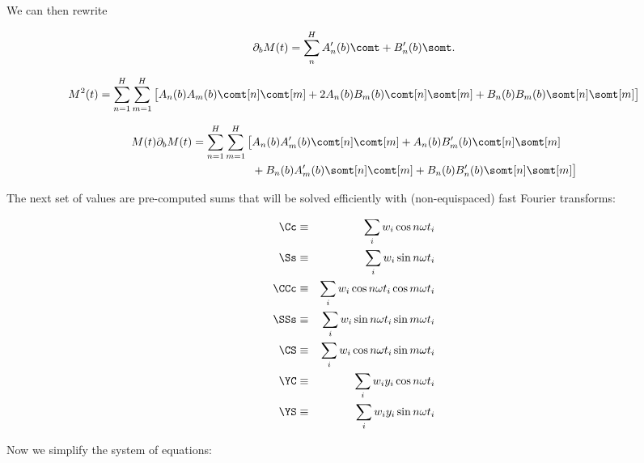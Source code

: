 







We can then rewrite

\begin{equation}
\partial_b M(t) = \sum_n^H A'_n(b)\comt + B'_n(b)\somt.
\end{equation}



\begin{align}
\label{eq:msquared}
M^2(t) = \sum_{n=1}^H\sum_{m=1}^H\big[A_n(b)A_m(b)\comt[n]\comt[m] + 2A_n(b)B_m(b)\comt[n]\somt[m] + B_n(b)B_m(b)\somt[n]\somt[m]\big]
\end{align}

\begin{align}
\label{eq:mdbm}
M(t)\partial_b M(t) = \sum_{n=1}^H\sum_{m=1}^H\big[&A_n(b)A'_m(b)\comt[n]\comt[m] + A_n(b)B'_m(b)\comt[n]\somt[m] \\
			          &+ B_n(b)A'_m(b)\somt[n]\comt[m] + B_n(b) B'_n(b)\somt[n]\somt[m]\big]
\end{align}

The next set of values are pre-computed sums that will be solved efficiently with (non-equispaced) fast Fourier transforms:

\begin{eqnarray}
\Cc   &\equiv& \sum_i w_i \cos n\omega t_i\\
\Ss   &\equiv& \sum_i w_i \sin n\omega t_i\\
\CCc &\equiv& \sum_i w_i \cos n\omega t_i\cos m \omega t_i\\
\SSs &\equiv& \sum_i w_i \sin n\omega t_i\sin m \omega t_i\\
\CS &\equiv& \sum_i w_i \cos n\omega t_i\sin m \omega t_i\\
\YC  &\equiv& \sum_i w_i y_i \cos n\omega t_i\\
\YS  &\equiv& \sum_i w_i y_i \sin n\omega t_i
\end{eqnarray}

Now we simplify the system of equations:

